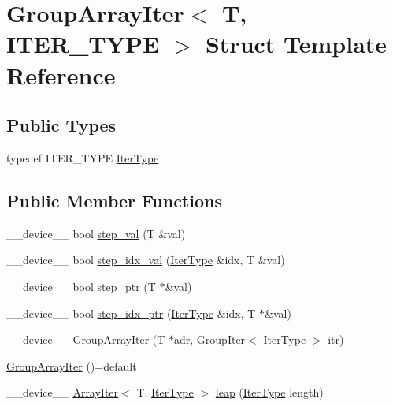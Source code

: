 \hypertarget{structGroupArrayIter}{\section{Group\-Array\-Iter$<$ T, I\-T\-E\-R\-\_\-\-T\-Y\-P\-E $>$ Struct Template Reference}
\label{structGroupArrayIter}
}
\subsection*{Public Types}
\begin{DoxyCompactItemize}
\item 
typedef I\-T\-E\-R\-\_\-\-T\-Y\-P\-E \hyperlink{structGroupArrayIter_a61733327ff96821c9c80d63fa2c11337}{Iter\-Type}
\end{DoxyCompactItemize}
\subsection*{Public Member Functions}
\begin{DoxyCompactItemize}
\item 
\-\_\-\-\_\-device\-\_\-\-\_\- bool \hyperlink{structGroupArrayIter_ac8bf3787eb0f5ee8981424deb3aef84e}{step\-\_\-val} (T \&val)
\item 
\-\_\-\-\_\-device\-\_\-\-\_\- bool \hyperlink{structGroupArrayIter_a41b1fade93cc7041eea538417f9e77cb}{step\-\_\-idx\-\_\-val} (\hyperlink{structGroupArrayIter_a61733327ff96821c9c80d63fa2c11337}{Iter\-Type} \&idx, T \&val)
\item 
\-\_\-\-\_\-device\-\_\-\-\_\- bool \hyperlink{structGroupArrayIter_aaea42e3a6911cd4a34e3a181cb727656}{step\-\_\-ptr} (T $\ast$\&val)
\item 
\-\_\-\-\_\-device\-\_\-\-\_\- bool \hyperlink{structGroupArrayIter_a12939c1fe4dca67dbd9719b3733760a7}{step\-\_\-idx\-\_\-ptr} (\hyperlink{structGroupArrayIter_a61733327ff96821c9c80d63fa2c11337}{Iter\-Type} \&idx, T $\ast$\&val)
\item 
\-\_\-\-\_\-device\-\_\-\-\_\- \hyperlink{structGroupArrayIter_aaf4b71fa789bdb964f4ca33d8c1dc330}{Group\-Array\-Iter} (T $\ast$adr, \hyperlink{structGroupIter}{Group\-Iter}$<$ \hyperlink{structGroupArrayIter_a61733327ff96821c9c80d63fa2c11337}{Iter\-Type} $>$ itr)
\item 
\hyperlink{structGroupArrayIter_a503dd510321637227d0c2caacc052531}{Group\-Array\-Iter} ()=default
\item 
\-\_\-\-\_\-device\-\_\-\-\_\- \hyperlink{structArrayIter}{Array\-Iter}$<$ T, \hyperlink{structGroupArrayIter_a61733327ff96821c9c80d63fa2c11337}{Iter\-Type} $>$ \hyperlink{structGroupArrayIter_a925c28e7aea5446758798babf027590e}{leap} (\hyperlink{structGroupArrayIter_a61733327ff96821c9c80d63fa2c11337}{Iter\-Type} length)
\end{DoxyCompactItemize}
